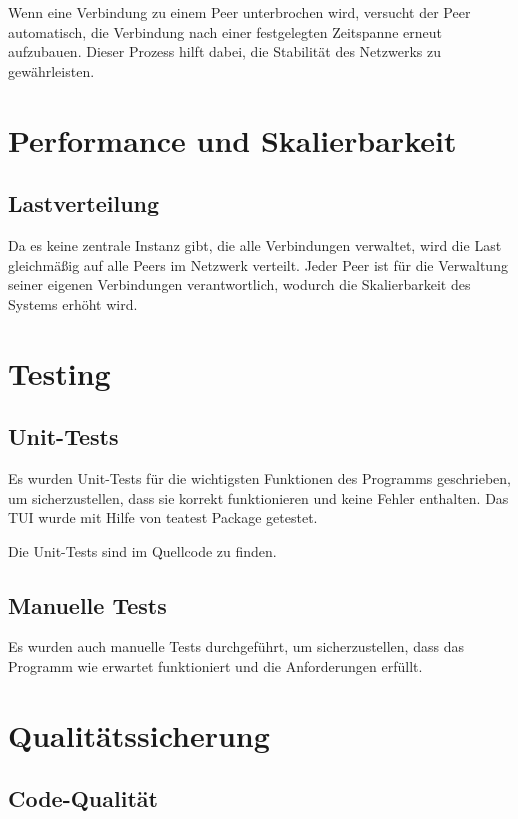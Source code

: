 Wenn eine Verbindung zu einem Peer unterbrochen wird, versucht der Peer automatisch, die Verbindung nach einer festgelegten Zeitspanne erneut aufzubauen. Dieser Prozess hilft dabei, die Stabilität des Netzwerks zu gewährleisten.

\section{Performance und Skalierbarkeit}

\subsection{Lastverteilung}

Da es keine zentrale Instanz gibt, die alle Verbindungen verwaltet, wird die Last gleichmäßig auf alle Peers im Netzwerk verteilt. Jeder Peer ist für die Verwaltung seiner eigenen Verbindungen verantwortlich, wodurch die Skalierbarkeit des Systems erhöht wird.



\section{Testing}

\subsection{Unit-Tests}

Es wurden Unit-Tests für die wichtigsten Funktionen des Programms geschrieben, um sicherzustellen, dass sie korrekt funktionieren und keine Fehler enthalten.
Das TUI wurde mit Hilfe von teatest Package getestet. \cite{teatest_docs}

Die Unit-Tests sind im Quellcode zu finden.


\subsection{Manuelle Tests}

Es wurden auch manuelle Tests durchgeführt, um sicherzustellen, dass das Programm wie erwartet funktioniert und die Anforderungen erfüllt.

\section{Qualitätssicherung}

\subsection{Code-Qualität}

